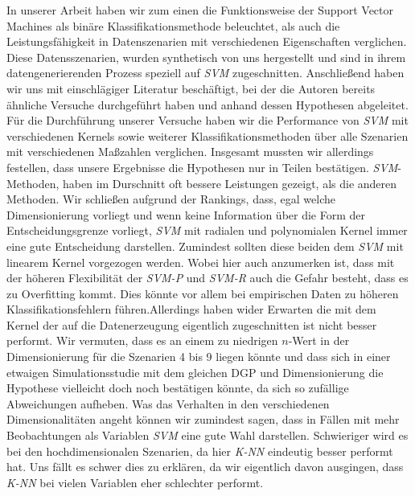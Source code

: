 \documentclass[
]{article}
\begin{document}
In unserer Arbeit haben wir zum einen die Funktionsweise der Support
Vector Machines als binäre Klassifikationsmethode beleuchtet, als auch
die Leistungsfähigkeit in Datenszenarien mit verschiedenen Eigenschaften
verglichen. Diese Datensszenarien, wurden synthetisch von uns
hergestellt und sind in ihrem datengenerierenden Prozess speziell auf
\textit{SVM} zugeschnitten. Anschließend haben wir uns mit einschlägiger
Literatur beschäftigt, bei der die Autoren bereits ähnliche Versuche
durchgeführt haben und anhand dessen Hypothesen abgeleitet. Für die
Durchführung unserer Versuche haben wir die Performance von \textit{SVM}
mit verschiedenen Kernels sowie weiterer Klassifikationsmethoden über
alle Szenarien mit verschiedenen Maßzahlen verglichen. \newline 
Insgesamt mussten wir allerdings festellen, dass unsere Ergebnisse die
Hypothesen nur in Teilen bestätigen. \textit{SVM}-Methoden, haben im
Durschnitt oft bessere Leistungen gezeigt, als die anderen Methoden. Wir
schließen aufgrund der Rankings, dass, egal welche Dimensionierung
vorliegt und wenn keine Information über die Form der
Entscheidungsgrenze vorliegt, \textit{SVM} mit radialen und polynomialen
Kernel immer eine gute Entscheidung darstellen. Zumindest sollten diese
beiden dem \textit{SVM} mit linearem Kernel vorgezogen werden. Wobei
hier auch anzumerken ist, dass mit der höheren Flexibilität der
\textit{SVM-P} und \textit{SVM-R} auch die Gefahr besteht, dass es zu
Overfitting kommt. Dies könnte vor allem bei empirischen Daten zu
höheren Klassifikationsfehlern führen.\newline Allerdings haben wider
Erwarten die  mit dem Kernel der auf die Datenerzeugung
eigentlich zugeschnitten ist nicht besser performt. Wir vermuten, dass
es an einem zu niedrigen \(n\)-Wert in der Dimensionierung für die
Szenarien 4 bis 9 liegen könnte und dass sich in einer etwaigen
Simulationsstudie mit dem gleichen DGP und Dimensionierung die Hypothese
vielleicht doch noch bestätigen könnte, da sich so zufällige
Abweichungen aufheben. Was das Verhalten in den verschiedenen
Dimensionalitäten angeht können wir zumindest sagen, dass in Fällen mit
mehr Beobachtungen als Variablen \textit{SVM} eine gute Wahl darstellen.
Schwieriger wird es bei den hochdimensionalen Szenarien, da hier
\textit{K-NN} eindeutig besser performt hat. Uns fällt es schwer dies zu
erklären, da wir eigentlich davon ausgingen, dass \textit{K-NN} bei
vielen Variablen eher schlechter performt.
\end{document}
